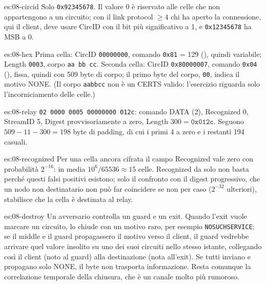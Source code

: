 \begin{soluzione}{es:08-circid}
Solo \texttt{0x92345678}. Il valore 0 è riservato alle celle che non appartengono a un circuito; con il link protocol $\ge 4$ chi ha aperto la connessione, qui il client, deve usare CircID con il bit più significativo a 1, e \texttt{0x12345678} ha MSB a 0.
\end{soluzione}

\begin{soluzione}{es:08-hex}
Prima cella: CircID \texttt{00000000}, comando \texttt{0x81} = 129 (), quindi variabile; Length \texttt{0003}, corpo \texttt{aa bb cc}. Seconda cella: CircID \texttt{0x80000007}, comando \texttt{0x04} (), fissa, quindi con 509 byte di corpo; il primo byte del corpo, \texttt{00}, indica il motivo NONE. (Il corpo \texttt{aabbcc} non è un CERTS valido: l'esercizio riguarda solo l'incorniciamento delle celle.)
\end{soluzione}

\begin{soluzione}{es:08-relay}
\texttt{02 0000 0005 00000000 012c}: comando DATA (2), Recognized 0, StreamID 5, Digest provvisoriamente a zero, Length $300 = \texttt{0x012c}$. Seguono $509 - 11 - 300 = 198$ byte di padding, di cui i primi 4 a zero e i restanti 194 casuali.
\end{soluzione}

\begin{soluzione}{es:08-recognized}
Per una cella ancora cifrata il campo Recognized vale zero con probabilità $2^{-16}$: in media $10^6 / 65536 \approx 15$ celle. Recognized da solo non basta perché questi falsi positivi esistono; solo il confronto con il digest progressivo, che un nodo non destinatario non può far coincidere se non per caso ($2^{-32}$ ulteriori), stabilisce che la cella è destinata al relay.
\end{soluzione}

\begin{soluzione}{es:08-destroy}
Un avversario controlla un guard e un exit. Quando l'exit vuole marcare un circuito, lo chiude con un motivo raro, per esempio \texttt{NOSUCHSERVICE}; se il middle e il guard propagassero il motivo verso il client, il guard vedrebbe arrivare quel valore insolito su uno dei suoi circuiti nello stesso istante, collegando così il client (noto al guard) alla destinazione (nota all'exit). Se tutti inviano e propagano solo NONE, il byte non trasporta informazione. Resta comunque la correlazione temporale della chiusura, che è un canale molto più rumoroso.
\end{soluzione}

